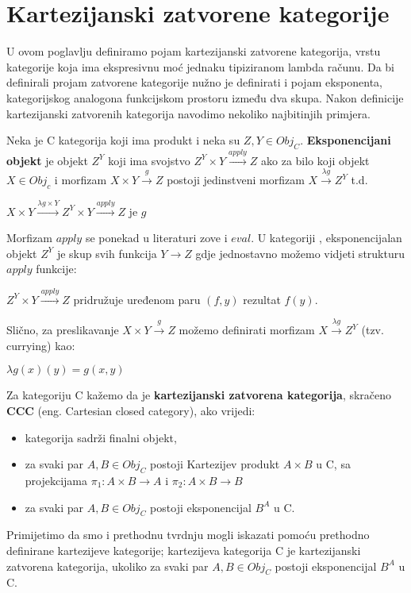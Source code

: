   \section{Kartezijanski zatvorene kategorije}
  U ovom poglavlju definiramo pojam kartezijanski zatvorene kategorija, vrstu kategorije koja ima ekspresivnu moć jednaku tipiziranom lambda računu.  Da bi definirali projam zatvorene kategorije nužno je definirati i pojam eksponenta, kategorijskog analogona funkcijskom prostoru između dva skupa. Nakon definicije kartezijanski zatvorenih kategorija navodimo nekoliko najbitinjih primjera. 
  \begin{definition}
    Neka je C kategorija koji ima produkt i neka su $Z, Y \in Obj_C$. \textbf{Eksponencijani objekt} je objekt $Z^Y$ koji ima svojstvo $Z^Y \times Y \xrightarrow{apply} Z$ ako za bilo koji objekt $X \in Obj_c$ i morfizam $X \times Y \xrightarrow{g} Z$ postoji jedinstveni morfizam $X \xrightarrow{\lambda g} Z^Y$ t.d.
    \begin{center}
      $X \times Y \xrightarrow{\lambda g \times Y} Z^Y \times Y \xrightarrow{apply} Z$ je $g$
    \end{center}
  \end{definition}
    Morfizam $apply$ se ponekad u literaturi zove i $eval$. U kategoriji , eksponencijalan objekt $Z^Y$ je skup svih funkcija $Y \to Z$ gdje jednostavno možemo vidjeti strukturu $apply$ funkcije:
    \begin{center}
      $Z^Y \times Y \xrightarrow{apply} Z$ pridružuje uređenom paru $(f, y)$ rezultat $f(y)$.
    \end{center}
    Slično, za preslikavanje $X \times Y \xrightarrow{g} Z$ možemo definirati morfizam $X \xrightarrow{\lambda g} Z^Y$ (tzv. currying) kao:
    \begin{center}
      $\lambda g(x)(y) = g(x, y)$
    \end{center}
  \begin{definition}
    Za kategoriju C kažemo da je \textbf{kartezijanski zatvorena kategorija}, skračeno \textbf{CCC} (eng. Cartesian closed category), ako vrijedi:
    \begin{itemize}
      \item kategorija  sadrži finalni objekt,
      \item za svaki par $A, B \in Obj_C$ postoji Kartezijev produkt $A \times B$ u C, sa projekcijama $\pi_1 : A \times B \to A$ i $\pi_2 : A \times B \to B$
      \item za svaki par $A, B \in Obj_C$ postoji eksponencijal $B^A$ u C.
    \end{itemize}
  \end{definition}
  Primijetimo da smo i prethodnu tvrdnju mogli iskazati pomoću prethodno definirane kartezijeve kategorije; kartezijeva kategorija C je kartezijanski zatvorena kategorija, ukoliko za svaki par $A, B \in Obj_C$ postoji eksponencijal $B^A$ u C.

